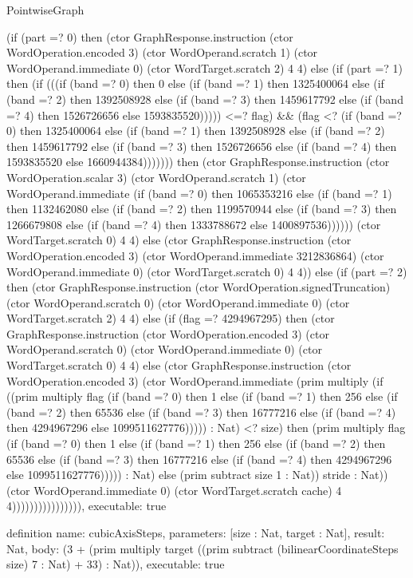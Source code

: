 \begin{lexlean}{PointwiseGraph}
\begin{semanticmodule}
{      (if (part =? 0) then (ctor GraphResponse.instruction (ctor WordOperation.encoded 3) (ctor WordOperand.scratch 1) (ctor WordOperand.immediate 0) (ctor WordTarget.scratch 2) 4 4) else (if (part =? 1) then (if (((if (band =? 0) then 0 else (if (band =? 1) then 1325400064 else (if (band =? 2) then 1392508928 else (if (band =? 3) then 1459617792 else (if (band =? 4) then 1526726656 else 1593835520))))) <=? flag) && (flag <? (if (band =? 0) then 1325400064 else (if (band =? 1) then 1392508928 else (if (band =? 2) then 1459617792 else (if (band =? 3) then 1526726656 else (if (band =? 4) then 1593835520 else 1660944384))))))) then (ctor GraphResponse.instruction (ctor WordOperation.scalar 3) (ctor WordOperand.scratch 1) (ctor WordOperand.immediate (if (band =? 0) then 1065353216 else (if (band =? 1) then 1132462080 else (if (band =? 2) then 1199570944 else (if (band =? 3) then 1266679808 else (if (band =? 4) then 1333788672 else 1400897536)))))) (ctor WordTarget.scratch 0) 4 4) else (ctor GraphResponse.instruction (ctor WordOperation.encoded 3) (ctor WordOperand.immediate 3212836864) (ctor WordOperand.immediate 0) (ctor WordTarget.scratch 0) 4 4)) else (if (part =? 2) then (ctor GraphResponse.instruction (ctor WordOperation.signedTruncation) (ctor WordOperand.scratch 0) (ctor WordOperand.immediate 0) (ctor WordTarget.scratch 2) 4 4) else (if (flag =? 4294967295) then (ctor GraphResponse.instruction (ctor WordOperation.encoded 3) (ctor WordOperand.scratch 0) (ctor WordOperand.immediate 0) (ctor WordTarget.scratch 0) 4 4) else (ctor GraphResponse.instruction (ctor WordOperation.encoded 3) (ctor WordOperand.immediate (prim multiply (if ((prim multiply flag (if (band =? 0) then 1 else (if (band =? 1) then 256 else (if (band =? 2) then 65536 else (if (band =? 3) then 16777216 else (if (band =? 4) then 4294967296 else 1099511627776))))) : Nat) <? size) then (prim multiply flag (if (band =? 0) then 1 else (if (band =? 1) then 256 else (if (band =? 2) then 65536 else (if (band =? 3) then 16777216 else (if (band =? 4) then 4294967296 else 1099511627776))))) : Nat) else (prim subtract size 1 : Nat)) stride : Nat)) (ctor WordOperand.immediate 0) (ctor WordTarget.scratch cache) 4 4)))))))))))))))),
  executable: true
}

definition{
  name: cubicAxisSteps,
  parameters: [size : Nat, target : Nat],
  result: Nat,
  body: (3 + (prim multiply target ((prim subtract (bilinearCoordinateSteps size) 7 : Nat) + 33) : Nat)),
  executable: true
}


\end{semanticmodule}
\end{lexlean}
